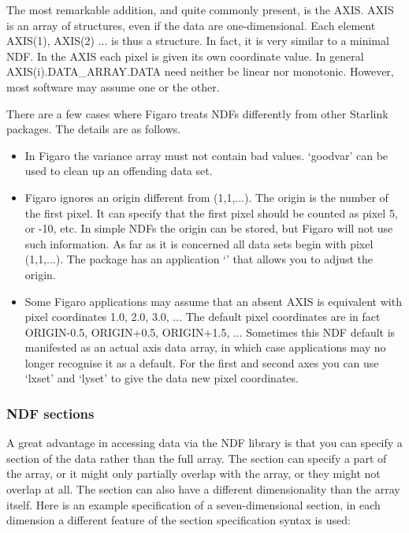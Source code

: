    The most remarkable addition, and quite commonly present, is the
   AXIS. AXIS is an array of structures, even if the data are
   one-dimensional. Each element AXIS(1), AXIS(2) ... is thus a
   structure. In fact, it is very similar to a minimal NDF. In the AXIS
   each pixel is given its own coordinate value. In general
   AXIS(i).DATA\_ARRAY.DATA need neither be linear nor monotonic.
   However, most software may assume one or the other.

   There are a few cases where Figaro treats NDFs differently from other
   Starlink packages.  The details are as follows.

\begin{itemize}
\item
   In Figaro the variance array must not contain bad values. `goodvar'
   can be used to clean up an offending data set.
\item
   Figaro ignores an origin different from (1,1,...).
   The origin is the number of the first pixel. It can specify that the
   first pixel should be counted as pixel 5, or -10, etc. In simple NDFs
   the origin can be stored, but Figaro will not use such
   information. As far as it is concerned all data sets begin with
   pixel (1,1,...). The  package has an
   application `' that allows you to
   adjust the origin.
\item
   Some Figaro applications may assume that an absent AXIS is
   equivalent with pixel coordinates 1.0, 2.0, 3.0, ...
   The default pixel coordinates are in fact ORIGIN-0.5,
   ORIGIN+0.5, ORIGIN+1.5, ...
   Sometimes this NDF default is manifested as an actual axis
   data array, in which case applications may no longer recognise it as
   a default. For the first and second axes you can use `lxset' and
   `lyset' to give the data new pixel coordinates.
\end{itemize}


\subsubsection{\label{filesndfsect}NDF sections}

   A great advantage in accessing data via the NDF library is that you
   can specify a section of the data rather than the full array.
   The section can specify a part of the array, or it might only
   partially overlap with the array, or they might not overlap at
   all. The section can also have a different
   dimensionality than the array itself. Here is an example
   specification of a seven-dimensional section, in each dimension a
   different feature of the section specification syntax is used:

